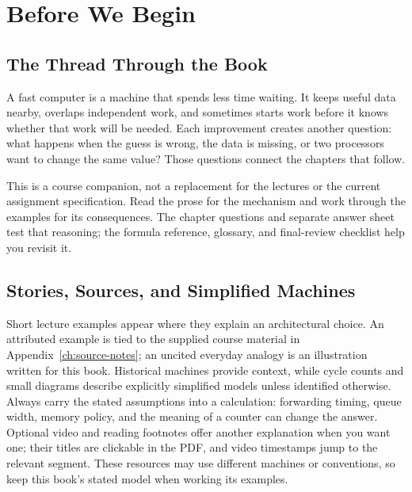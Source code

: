 \chapter*{Before We Begin}\label{ch:auto-001}


\section*{The Thread Through the Book}\label{sec:auto-001}
A fast computer is a machine that spends less time waiting.
It keeps useful data nearby, overlaps independent work, and sometimes starts work before it knows whether that work will be needed.
Each improvement creates another question: what happens when the guess is wrong, the data is missing, or two processors want to change the same value?
Those questions connect the chapters that follow.

This is a course companion, not a replacement for the lectures or the current assignment specification.
Read the prose for the mechanism and work through the examples for its consequences.
The chapter questions and separate answer sheet test that reasoning; the formula reference, glossary, and final-review checklist help you revisit it.

\section*{Stories, Sources, and Simplified Machines}
Short lecture examples appear where they explain an architectural choice.
An attributed example is tied to the supplied course material in Appendix~\ref{ch:source-notes}; an uncited everyday analogy is an illustration written for this book.
Historical machines provide context, while cycle counts and small diagrams describe explicitly simplified models unless identified otherwise.
Always carry the stated assumptions into a calculation: forwarding timing, queue width, memory policy, and the meaning of a counter can change the answer.
Optional video and reading footnotes offer another explanation when you want one; their titles are clickable in the PDF, and video timestamps jump to the relevant segment.
These resources may use different machines or conventions, so keep this book's stated model when working its examples.


